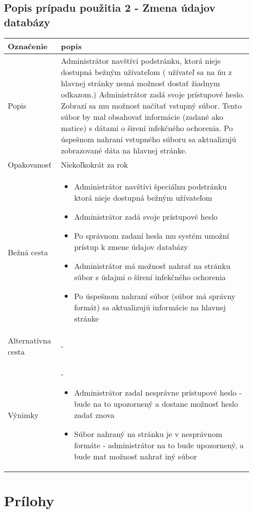 \documentclass[12pt,a4paper]{report}
\begin{document}
\section[Popis prípadu použitia 2 - Zmena údajov databázy]{\rmfamily\bfseries
	Popis prípadu použitia 2 - Zmena údajov databázy}
\begin{table}[h!]
	\centering
	\begin{tabular}{|>{\centering\arraybackslash}m{3in}|>{\centering\arraybackslash}m{3in}|}
		\hline
		\centering Označenie & popis \\ [0ex]
		\hline
		Popis & Administrátor navštívi podstránku, ktorá nieje dostupná bežným užívateľom (
		užívateľ sa na ňu z hlavnej stránky nemá možnosť dostať žiadnym odkazom.) Administrátor
		zadá svoje prístupové heslo. Zobrazí sa mu možnosť načítať vstupný súbor. Tento
		súbor by mal obsahovať informácie (zadané ako matice) s dátami o širení infekčného
		ochorenia. Po úspešnom nahraní vstupného súboru sa aktualizujú zobrazované
		dáta na hlavnej stránke.\\ [0ex]
		\hline
		Opakovanosť & Niekoľkokrát za rok \\ [0ex]
		\hline
		Bežná cesta & 	\begin{itemize}
							\item Administrátor navštívi špeciálnu podstránku ktorá nieje dostupná bežným užívateľom
							\item Administrátor zadá svoje prístupové heslo
							\item Po správnom zadaní hesla mu systém umožní prístup k zmene údajov databázy
							\item Administrátor má možnosť nahrať na stránku súbor s údajmi o šírení infekčného ochorenia
							\item Po úspešnom nahraní súbor (súbor má správny formát) sa aktualizujú informácie na hlavnej stránke
						\end{itemize} \\ [0ex]
		\hline
		Alternatívna cesta & - \\ [0ex]
		\hline
		Výnimky & - \begin{itemize}
						\item Administrátor zadal nesprávne prístupové heslo - bude na to upozornený a dostane možnosť heslo zadať znova
						\item Súbor nahraný na stránku je v nesprávnom formáte - administrátor na to bude upozornený, a bude mať možnosť nahrať iný súbor
					\end{itemize} \\ [0ex]
		\hline
	\end{tabular}
\end{table}

\renewcommand{\chaptername}{}	
\chapter[Prílohy]{\rmfamily\bfseries
	Prílohy}
\end{document}
